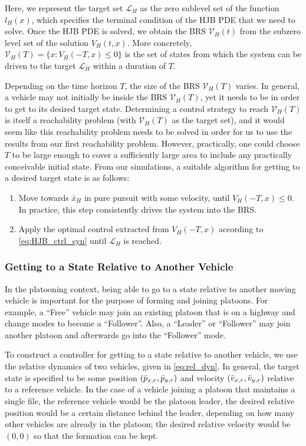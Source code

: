Here, we represent the target set $\mathcal{L}_H$ as the zero sublevel set of the function $l_H(x)$, which specifies the terminal condition of the HJB PDE that we need to solve. Once the HJB PDE is solved, we obtain the BRS $\mathcal V_H(t)$ from the subzero level set of the solution $V_H(t,x)$. More concretely, $\mathcal{V}_H(T) = \{x: V_H(-T,x)\le 0\}$ is the set of states from which the system can be driven to the target $\mathcal{L}_H$ within a duration of $T$. 

Depending on the time horizon $T$, the size of the BRS $\mathcal V_H(T)$ varies. In general, a vehicle may not initially be inside the BRS $\mathcal V_H(T)$, yet it needs to be in order to get to its desired target state. Determining a control strategy to reach $\mathcal V_H(T)$ is itself a reachability problem (with $\mathcal V_H(T)$ as the target set), and it would seem like this reachability problem needs to be solved in order for us to use the results from our first reachability problem. However, practically, one could choose $T$ to be large enough to cover a sufficiently large area to include any practically conceivable initial state. From our simulations, a suitable algorithm for getting to a desired target state is as follows:

\begin{enumerate}
\item Move towards $\bar{x}_H$ in pure pursuit with some velocity, until $V_H(-T,x)\le 0$. In practice, this step consistently drives the system into the BRS.
\item Apply the optimal control extracted from $V_H(-T,x)$ according to \eqref{eq:HJB_ctrl_syn} until $\mathcal{L}_H$ is reached.
\end{enumerate}

\subsubsection{Getting to a State Relative to Another Vehicle \label{sec:rel_target_ctrl}}
In the platooning context, being able to go to a state relative to another moving vehicle is important for the purpose of forming and joining platoons. For example, a ``Free'' vehicle may join an existing platoon that is on a highway and change modes to become a ``Follower''. Also, a ``Leader'' or ``Follower'' may join another platoon and afterwards go into the ``Follower'' mode.

To construct a controller for getting to a state relative to another vehicle, we use the relative dynamics of two vehicles, given in \eqref{eq:rel_dyn}. In general, the target state is specified to be some position $(\bar{p}_{x,r}, \bar{p}_{y,r})$ and velocity $(\bar{v}_{x,r}, \bar{v}_{y,r})$ relative to a reference vehicle. In the case of a vehicle joining a platoon that maintains a single file, the reference vehicle would be the platoon leader, the desired relative position would be a certain distance behind the leader, depending on how many other vehicles are already in the platoon; the desired relative velocity would be $(0,0)$ so that the formation can be kept.

